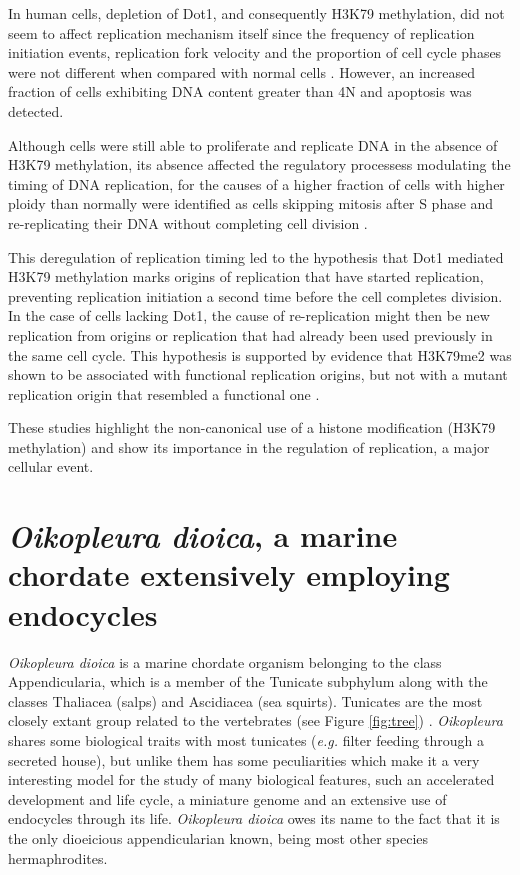 \documentclass[11pt,twoside,a4paper]{report}
\begin{document}
		In human cells, depletion of Dot1, and consequently H3K79 methylation, did not seem to affect replication mechanism itself since the frequency of replication initiation events, replication fork velocity and the proportion of cell cycle phases were not different when compared with normal cells \cite{Fu2013a}. However, an increased fraction of cells exhibiting DNA content greater than 4N and apoptosis was detected.
		
		Although cells were still able to proliferate and replicate DNA in the absence of H3K79 methylation, its absence affected the regulatory processess modulating the timing of DNA replication, for the causes of a higher fraction of cells with higher ploidy than normally were identified as cells skipping mitosis after S phase and re-replicating their DNA without completing cell division \cite{Fu2013a}.
		
		This deregulation of replication timing led to the hypothesis that Dot1 mediated H3K79 methylation marks origins of replication that have started replication, preventing replication initiation a second time before the cell completes division. In the case of cells lacking Dot1, the cause of re-replication might then be new replication from origins or replication that had already been used previously in the same cell cycle. This hypothesis is supported by evidence that H3K79me2 was shown to be associated with functional replication origins, but not with a mutant replication origin that resembled a functional one \cite{Fu2013a}.
		
		These studies highlight the non-canonical use of a histone modification (H3K79 methylation) and show its importance in the regulation of replication, a major cellular event.

	\clearpage
	\section{\textit{Oikopleura dioica}, a marine chordate extensively employing endocycles}
		\textit{Oikopleura dioica} is a marine  chordate organism belonging to the class Appendicularia, which is a member of the Tunicate subphylum along with the classes Thaliacea (salps) and Ascidiacea (sea squirts). Tunicates are the most closely extant group related to the vertebrates (see Figure \ref{fig:tree}) \cite{Delsuc2006}. \textit{Oikopleura} shares some biological traits with most tunicates (\textit{e.g.} filter feeding through a secreted house), but unlike them has some peculiarities which make it a very interesting model for the study of many biological features, such an accelerated development and life cycle, a miniature genome and an extensive use of endocycles through its life. \textit{Oikopleura dioica} owes its name to the fact that it is the only dioeicious appendicularian known, being most other species hermaphrodites.
		
\end{document}
